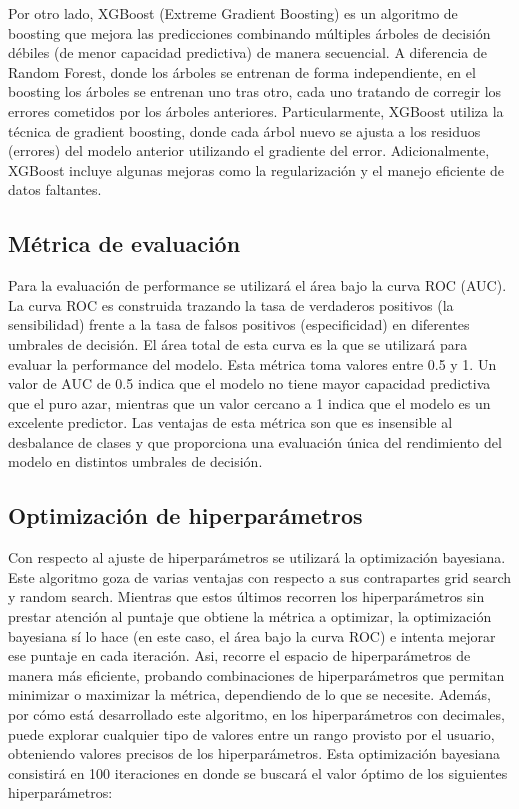 \documentclass{article}
\begin{document}
Por otro lado, XGBoost (Extreme Gradient Boosting) es un algoritmo de boosting que mejora 
las predicciones combinando múltiples árboles de decisión débiles (de menor capacidad 
predictiva) de manera secuencial. A diferencia de Random Forest, donde los árboles se 
entrenan de forma independiente, en el boosting los árboles se entrenan uno tras otro, 
cada uno tratando de corregir los errores cometidos por los árboles anteriores. 
Particularmente, XGBoost utiliza la técnica de gradient boosting, donde cada árbol nuevo 
se ajusta a los residuos (errores) del modelo anterior utilizando el gradiente del error. 
Adicionalmente, XGBoost incluye algunas mejoras como la regularización
y el manejo eficiente de datos faltantes. 

\subsection{Métrica de evaluación}
Para la evaluación de performance se utilizará el área bajo la curva ROC 
(AUC). La curva ROC es construida trazando la tasa de verdaderos positivos (la 
sensibilidad) frente a la tasa de falsos positivos (especificidad) en diferentes umbrales 
de decisión. El área total de esta curva es la que se utilizará para evaluar la 
performance del modelo. Esta métrica toma valores entre 0.5 y 1. Un valor de AUC de 0.5 
indica que el modelo no tiene mayor capacidad predictiva que el puro azar, mientras que un 
valor cercano a 1 indica que el modelo es un excelente predictor. Las ventajas de 
esta métrica son que es insensible al desbalance de clases y que proporciona una evaluación
única del rendimiento del modelo en distintos umbrales de decisión.

\subsection{Optimización de hiperparámetros}
Con respecto al ajuste de hiperparámetros se utilizará la optimización bayesiana. Este
algoritmo goza de varias ventajas con respecto a sus contrapartes grid search y random
search. Mientras que estos últimos recorren los hiperparámetros
sin prestar atención al puntaje que obtiene la métrica a optimizar, la optimización bayesiana
sí lo hace (en este caso, el área bajo la curva ROC) e intenta mejorar ese puntaje en cada iteración. 
Asi, recorre el espacio de hiperparámetros de manera más eficiente,
probando combinaciones de hiperparámetros que permitan minimizar o maximizar la métrica, dependiendo
de lo que se necesite.
Además, por cómo está desarrollado este algoritmo, en los hiperparámetros con decimales, puede
explorar cualquier tipo de valores entre un rango provisto por el usuario, obteniendo valores
precisos de los hiperparámetros. Esta optimización bayesiana consistirá en 100 
iteraciones en donde se buscará el valor óptimo de los siguientes hiperparámetros:
\end{document}
